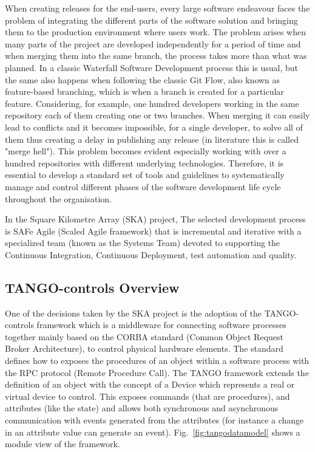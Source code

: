 \documentclass[a4paper]{spie}  %
\begin{document}
When creating releases for the end-users, every large software endeavour faces the problem of integrating the different parts of the software solution and bringing them to the production environment where users work. The problem arises when many parts of the project are developed independently for a period of time and when merging them into the same branch, the process takes more than what was planned. In a classic Waterfall Software Development process this is usual, but the same also happens when following the classic Git Flow, also known as feature-based branching, which is when a branch is created for a particular feature. Considering, for example, one hundred developers working in the same repository each of them creating one or two branches. When merging it can easily lead to conflicts and it becomes impossible, for a single developer, to solve all of them thus creating a delay in publishing any release (in literature this is called "merge hell"). This problem becomes evident especially working with over a hundred repositories with different underlying technologies. Therefore, it is essential to develop a standard set of tools and guidelines to systematically manage and control different phases of the software development life cycle throughout the organisation.

In the Square Kilometre Array (SKA) project, The selected development process is SAFe Agile (Scaled Agile framework) that is incremental and iterative with a specialized team (known as the Systems Team) devoted to supporting the Continuous Integration, Continuous Deployment, test automation and quality.

\subsection{TANGO-controls Overview}
One of the decisions taken by the SKA project is the adoption of the TANGO-controls\cite{tango-controls} framework which is a middleware for connecting software processes together mainly based on the CORBA standard (Common Object Request Broker Architecture), to control physical hardware elements. The standard defines how to exposes the procedures of an object within a software process with the RPC protocol (Remote Procedure Call).  The TANGO framework extends the definition of an object with the concept of a Device which represents a real or virtual device to control.  This exposes commands (that are procedures), and attributes (like the state) and allows both synchronous and asynchronous communication with events generated from the attributes (for instance a change in an attribute value can generate an event). Fig.~\ref{fig:tangodatamodel}  shows a module view of the framework.
\end{document}
